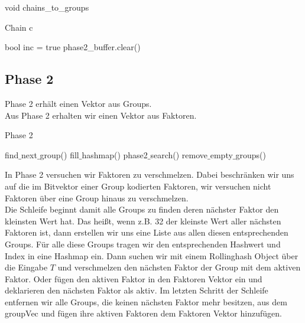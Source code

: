 \newpage
\begin{algorithm}[ht!]
	\caption{	void chains\_to\_groups}
	
	
	Chain c\;
	
	bool inc = true\;
	phase2\_buffer.clear()\;
	
\end{algorithm}


\subsection{Phase 2}
Phase 2 erhält einen Vektor aus Groups.\\
Aus Phase 2 erhalten wir einen Vektor aus Faktoren.\\
\begin{algorithm}[ht!]
	\caption{Phase 2}
	{
		find$\_$next$\_$group()\;
		fill$\_$hashmap()\;
		phase2$\_$search()\;
		remove$\_$empty$\_$groups()\;
	}	
\end{algorithm}
\noindent
In Phase 2 versuchen wir Faktoren zu verschmelzen.  Dabei beschränken wir uns auf die  im Bitvektor einer Group kodierten Faktoren, wir versuchen nicht Faktoren über eine Group hinaus zu verschmelzen.\\
Die Schleife beginnt damit alle Groups zu finden deren nächster Faktor den kleinsten Wert hat. Das heißt, wenn z.B. 32 der kleinste Wert aller nächsten Faktoren ist, dann erstellen wir uns eine Liste aus allen diesen entsprechenden Groups.
Für alle diese Groups tragen wir den entsprechenden Hashwert und Index in eine Hashmap ein.
Dann suchen wir mit einem Rollinghash Object über die Eingabe $T$ und verschmelzen den nächsten Faktor der Group mit dem aktiven Faktor. Oder fügen den  aktiven Faktor in den Faktoren Vektor ein und deklarieren den nächsten Faktor als aktiv.
Im letzten Schritt der Schleife entfernen wir alle Groups, die keinen nächsten Faktor mehr besitzen, aus dem groupVec und fügen ihre aktiven Faktoren dem Faktoren Vektor hinzufügen.


